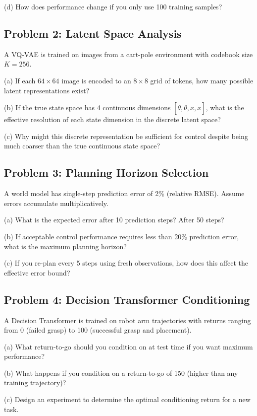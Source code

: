 (d) How does performance change if you only use 100 training samples?

\subsection{Problem 2: Latent Space Analysis}

A VQ-VAE is trained on images from a cart-pole environment with codebook size $K = 256$.

(a) If each $64 \times 64$ image is encoded to an $8 \times 8$ grid of tokens, how many possible latent representations exist?

(b) If the true state space has 4 continuous dimensions $[\theta, \dot{\theta}, x, \dot{x}]$, what is the effective resolution of each state dimension in the discrete latent space?

(c) Why might this discrete representation be sufficient for control despite being much coarser than the true continuous state space?

\subsection{Problem 3: Planning Horizon Selection}

A world model has single-step prediction error of 2\% (relative RMSE). Assume errors accumulate multiplicatively.

(a) What is the expected error after 10 prediction steps? After 50 steps?

(b) If acceptable control performance requires less than 20\% prediction error, what is the maximum planning horizon?

(c) If you re-plan every 5 steps using fresh observations, how does this affect the effective error bound?

\subsection{Problem 4: Decision Transformer Conditioning}

A Decision Transformer is trained on robot arm trajectories with returns ranging from 0 (failed grasp) to 100 (successful grasp and placement).

(a) What return-to-go should you condition on at test time if you want maximum performance?

(b) What happens if you condition on a return-to-go of 150 (higher than any training trajectory)?

(c) Design an experiment to determine the optimal conditioning return for a new task.

